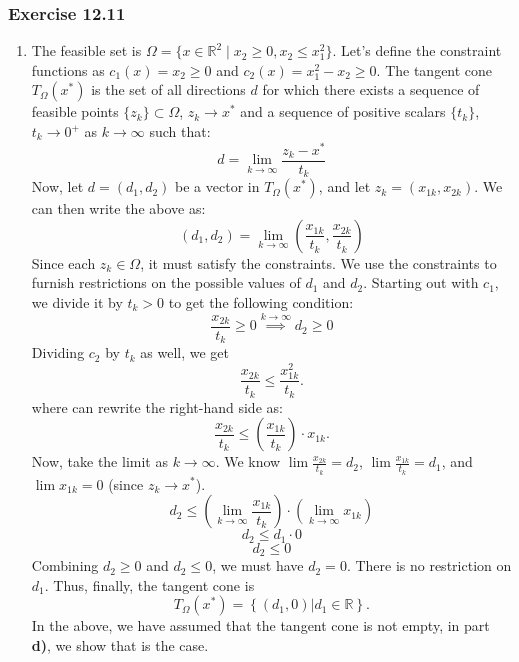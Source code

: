 \subsubsection{Exercise 12.11}
\begin{enumerate}
    \item[(a)] The feasible set is $\Omega = \{ x \in \mathbb{R}^2 \mid x_2 \ge 0, x_2 \le x_1^2 \}$.
          Let's define the constraint functions as $c_1(x) = x_2 \ge 0$ and $c_2(x) = x_1^2 - x_2 \ge 0$.
          The tangent cone $T_\Omega(x^*)$ is the set of all directions $d$ for which there exists a sequence of feasible points $\{z_k\} \subset \Omega$, $z_k \to x^*$ and a sequence of positive scalars $\{t_k\}$, $t_k \to 0^+$ as $k\to\infty$ such that:
          \[
              d = \lim_{k \to \infty} \frac{z_k - x^*}{t_k}
          \]
          Now, let $d = (d_1, d_2)$ be a vector in $T_\Omega(x^*)$, and let $z_k = (x_{1k}, x_{2k})$. We can then write the above as:
          \[
              (d_1, d_2) = \lim_{k \to \infty} \left( \frac{x_{1k}}{t_k}, \frac{x_{2k}}{t_k} \right)
          \]
          Since each $z_k \in \Omega$, it must satisfy the constraints.
          We use the constraints to furnish restrictions on the possible values of $d_1$ and $d_2$.
          Starting out with $c_1$, we divide it by $t_k > 0$ to get the following condition:
          \[
              \frac{x_{2k}}{t_k} \ge 0 \overset{k\to\infty}{\implies} d_2 \ge 0
          \]
          Dividing $c_2$ by $t_k$ as well, we get
          \[
              \frac{x_{2k}}{t_k} \le \frac{x_{1k}^2}{t_k}.
          \]
          where can rewrite the right-hand side as:
          \[
              \frac{x_{2k}}{t_k} \le \left( \frac{x_{1k}}{t_k} \right) \cdot x_{1k}.
          \]
          Now, take the limit as $k \to \infty$. We know $\lim \frac{x_{2k}}{t_k} = d_2$, $\lim \frac{x_{1k}}{t_k} = d_1$, and $\lim x_{1k} = 0$ (since $z_k \to x^*$).
          \[
              d_2 \le \left( \lim_{k \to \infty} \frac{x_{1k}}{t_k} \right) \cdot \left( \lim_{k \to \infty} x_{1k} \right)
          \]
          \[
              d_2 \le d_1 \cdot 0
          \]
          \[
              d_2 \le 0
          \]
          Combining $d_2 \ge 0$ and $d_2 \le 0$, we must have $d_2 = 0$. There is no restriction on $d_1$.
          Thus, finally, the tangent cone is
          \[
              T_{\Omega}(x^*) = \left\{(d_1, 0) | d_1 \in \mathbb{R} \right\}.
          \]
          In the above, we have assumed that the tangent cone is not empty, in part \textbf{d)}, we show that is the case.


\end{enumerate}
